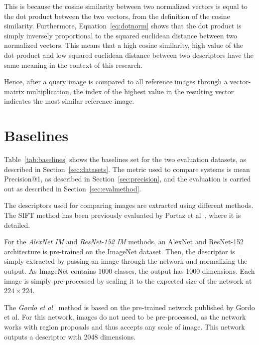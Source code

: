 This is because the cosine similarity between two normalized vectors is
equal to the dot product between the two vectors, from the definition
of the cosine similarity. Furthermore, Equation~\ref{eq:dotnorm} shows
that the dot product is simply inversely proportional to the squared
euclidean distance between two normalized vectors.
This means that a high cosine similarity, high value of the dot product
and low squared euclidean distance between two descriptors have the
same meaning in the context of this research.

Hence, after a query image is compared to all reference images through
a vector-matrix multiplication, the index of the highest value in the
resulting vector indicates the most similar reference image.

\section{Baselines}\label{sec:baselines}
Table~\ref{tab:baselines} shows the baselines set for the two evaluation
datasets, as described in Section~\ref{sec:datasets}. The metric used
to compare systems is mean Precision@1, as described in
Section~\ref{sec:precision}, and the evaluation is carried out as
described in Section~\ref{sec:evalmethod}.

The descriptors used for comparing images are extracted using different
methods.
The SIFT method has been previously evaluated by
Portaz et al~\cite{portaz_construction_nodate}, where it is detailed.

For the \emph{AlexNet IM} and \emph{ResNet-152 IM} methods,
an AlexNet and ResNet-152 architecture is pre-trained on the ImageNet dataset.
Then, the descriptor is simply extracted by passing an image through the
network and normalizing the output. As ImageNet contains 1000 classes, the
output has 1000 dimensions. Each image is simply pre-processed by scaling
it to the expected size of the network at $224 \times 224$.

The \emph{Gordo et al}~\cite{gordo_deep_2016} method is based on the
pre-trained network published by Gordo et al.
For this network, images do not need to
be pre-processed, as the network works with region proposals and thus accepts
any scale of image. This network outputs a descriptor with 2048 dimensions.


